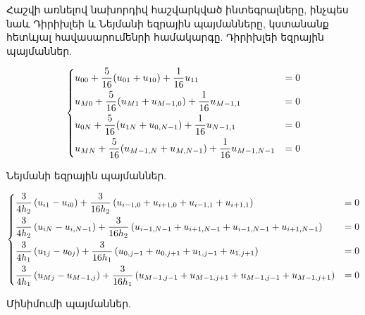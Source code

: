 \documentclass[fleqn, bachelor,subf,12pt,notitlepage]{disser}
\begin{document}
Հաշվի առնելով նախորդիվ հաշվարկված ինտեգրալները, ինչպես նաև Դիրիխլեի և Նեյմանի եզրային պայմանները, կստանանք հետևյալ հավասարումենրի համակարգը.
\noindent Դիրիխլեի եզրային պայմաններ.

$$\begin{dcases}
u_{00}+\frac{5}{16}(u_{01} + u_{10}) +\frac{1}{16}u_{11} &= 0\\
u_{M0}+\frac{5}{16}(u_{M1} + u_{M-1,0}) +\frac{1}{16}u_{M-1, 1} &= 0\\
u_{0N}+\frac{5}{16}(u_{1N} + u_{0,N-1}) +\frac{1}{16}u_{N-1, 1} &= 0\\
u_{MN}+\frac{5}{16}(u_{M-1,N} + u_{M,N-1}) +\frac{1}{16}u_{M-1,N-1} &= 0
\end{dcases}$$

\noindent Նեյմանի եզրային պայմաններ.

$$\begin{dcases}
\dfrac{3}{4h_{2}}\left(u_{i1} - u_{i0}\right) + \dfrac{3}{16h_{2}}\left(u_{i-1, 0}+u_{i+1, 0}+u_{i-1, 1}+u_{i+1, 1}\right)&=0\\
\dfrac{3}{4h_{2}}\left(u_{iN} - u_{i, N-1}\right) + \dfrac{3}{16h_{2}}\left(u_{i-1, N-1}+u_{i+1, N-1}+u_{i-1, N-1}+u_{i+1, N-1}\right)&=0\\
\dfrac{3}{4h_{1}}\left(u_{1j} - u_{0j}\right) + \dfrac{3}{16h_{1}}\left(u_{0, j-1}+u_{0, j+1}+u_{1, j-1}+u_{1, j+1}\right)&=0\\
\dfrac{3}{4h_{1}}\left(u_{Mj} - u_{M-1,j}\right) + \dfrac{3}{16h_{1}}\left(u_{M-1,j-1}+u_{M-1, j+1}+u_{M-1, j-1}+u_{M-1, j+1}\right)&=0\\
\end{dcases}$$

\noindent Մինիմումի պայմաններ.
\end{document}
